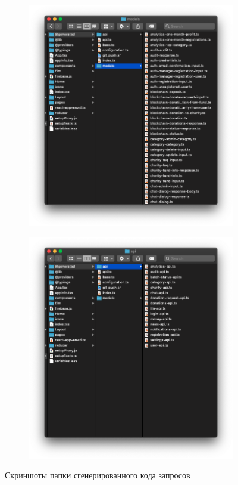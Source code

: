 \documentclass[a4paper,12pt,reqno]{article}
\begin{document}
\begin{figure}[H]
	    \centering
		\begin{subfigure}[b]{0.475\linewidth}
			\includegraphics[width=\linewidth]{img/generated1.png}
		\end{subfigure}
		\begin{subfigure}[b]{0.475\linewidth}
			\includegraphics[width=\linewidth]{img/generated2.png}
		\end{subfigure}
		\caption{Скриншоты папки сгенерированного кода запросов}
		\label{pic: generated}
\end{figure}
\end{document}
